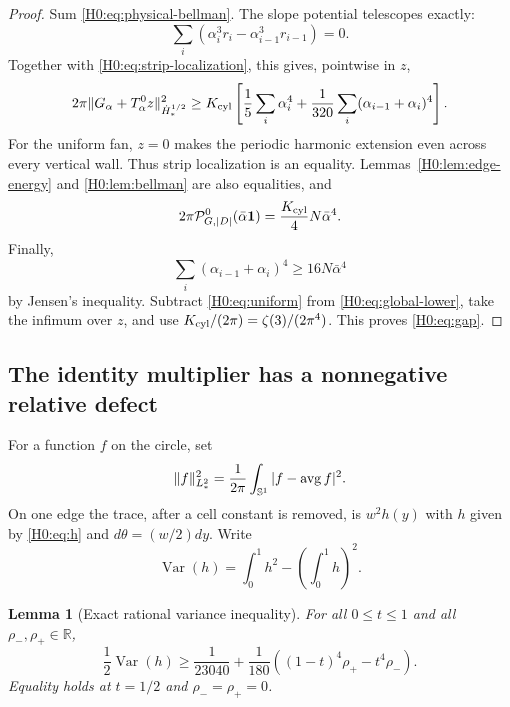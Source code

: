 \documentclass[11pt]{amsart}
\numberwithin{equation}{section}
\newtheorem{lemma}[theorem]{Lemma}
\theoremstyle{definition}
\theoremstyle{remark}
\newcommand{\Sone}{\mathbb S^1}
\newcommand{\R}{\mathbb R}
\newcommand{\PGdot}{\mathcal P_{G,|D|}^0}
\begin{document}
\begin{proof}
Sum \eqref{H0:eq:physical-bellman}.  The slope potential telescopes exactly:
\begin{equation}
 \sum_i(\alpha_i^3r_i-\alpha_{i-1}^3r_{i-1})=0.
\end{equation}
Together with \eqref{H0:eq:strip-localization}, this gives, pointwise in $z$,
\begin{equation}\label{H0:eq:global-lower}
 2\pi\|G_\alpha+T_\alpha^0z\|_{\dot H_*^{1/2}}^2
 \ge K_{\rm cyl}\left[
 \frac15\sum_i\alpha_i^4
 +\frac1{320}\sum_i(\alpha_{i-1}+\alpha_i)^4\right].
\end{equation}
For the uniform fan, $z=0$ makes the periodic harmonic extension even
across every vertical wall.  Thus strip localization is an equality.
Lemmas~\ref{H0:lem:edge-energy} and \ref{H0:lem:bellman} are also equalities, and
\begin{equation}\label{H0:eq:uniform}
 2\pi\PGdot(\bar\alpha\mathbf1)
 =\frac{K_{\rm cyl}}4N\bar\alpha^4.
\end{equation}
Finally,
\begin{equation}
 \sum_i(\alpha_{i-1}+\alpha_i)^4
 \ge16N\bar\alpha^4
\end{equation}
by Jensen's inequality.  Subtract \eqref{H0:eq:uniform} from
\eqref{H0:eq:global-lower}, take the infimum over $z$, and use
$K_{\rm cyl}/(2\pi)=\zeta(3)/(2\pi^4)$.  This proves
\eqref{H0:eq:gap}.
\end{proof}

\subsection{The identity multiplier has a nonnegative relative defect}

For a function $f$ on the circle, set
\begin{equation}
 \|f\|_{L_*^2}^2
 =\frac1{2\pi}\int_{\Sone}|f-\mathop{\rm avg}f|^2.
\end{equation}
On one edge the trace, after a cell constant is removed, is $w^2h(y)$ with
$h$ given by \eqref{H0:eq:h} and $d\theta=(w/2)dy$.  Write
\begin{equation}
 \operatorname {Var}(h)=\int_0^1h^2-\left(\int_0^1h\right)^2.
\end{equation}

\begin{lemma}[Exact rational variance inequality]\label{H0:lem:variance}
For all $0\le t\le1$ and all $\rho_-,\rho_+\in\R$,
\begin{equation}\label{H0:eq:variance}
 \frac12\operatorname {Var}(h)
 \ge\frac1{23040}
 +\frac1{180}\left((1-t)^4\rho_+-t^4\rho_-\right).
\end{equation}
Equality holds at $t=1/2$ and $\rho_-=\rho_+=0$.
\end{lemma}
\end{document}
